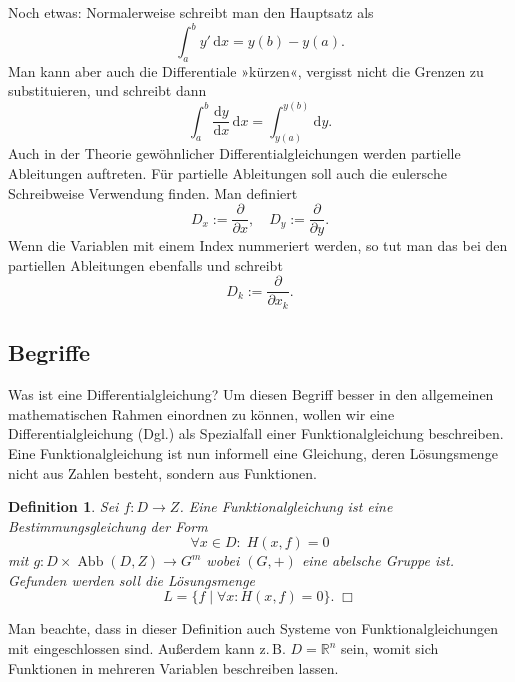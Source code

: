 \documentclass[a4paper,11pt,fleqn,twocolumn,twoside,openany]{scrartcl}
\numberwithin{equation}{section}
\newcommand{\R}{\mathbb R}
\theoremstyle{defstyle}
\newtheorem{Definition}{Definition}
\numberwithin{Definition}{section}
\begin{document}
Noch etwas: Normalerweise schreibt man den Hauptsatz als%
\begin{equation}
\int_a^b y'\,\mathrm dx = y(b)-y(a).
\end{equation}
Man kann aber auch die Differentiale »kürzen«,
vergisst nicht die Grenzen zu substituieren, und schreibt dann%
\begin{equation}
\int_a^b \frac{\mathrm dy}{\mathrm dx}\,\mathrm dx
= \int_{y(a)}^{y(b)}\mathrm dy.
\end{equation}
Auch in der Theorie gewöhnlicher Differentialgleichungen werden
partielle Ableitungen auftreten. Für partielle Ableitungen soll
auch die eulersche Schreibweise Verwendung finden. Man definiert%
\begin{equation}
D_x := \frac{\partial}{\partial x},\quad
D_y := \frac{\partial}{\partial y}.
\end{equation}
Wenn die Variablen mit einem Index nummeriert werden, so
tut man das bei den partiellen Ableitungen ebenfalls und schreibt%
\begin{equation}
D_k := \frac{\partial}{\partial x_k}.
\end{equation}

\subsection{Begriffe}
Was ist eine Differentialgleichung? Um diesen Begriff besser in den
allgemeinen mathematischen Rahmen einordnen zu können, wollen wir eine
Differentialgleichung (Dgl.) als Spezialfall einer Funktionalgleichung
beschreiben. Eine Funktionalgleichung ist nun informell eine Gleichung,
deren Lösungsmenge nicht aus Zahlen besteht, sondern aus Funktionen.

\begin{Definition}
Sei $f\colon D\to Z$. Eine \emph{Funktionalgleichung} ist
eine Bestimmungsgleichung der Form%
\begin{equation}\label{eq:Funktionalgleichung}
\forall x{\in}D\colon\;H(x,f)=0
\end{equation}
mit $g\colon D\times\operatorname{Abb}(D,Z)\to G^m$ wobei $(G,+)$
eine abelsche Gruppe ist. Gefunden werden soll die
Lösungsmenge%
\begin{equation}
L = \{f\mid\forall x\colon H(x,f)=0\}.\;\Box
\end{equation}
\end{Definition}
\noindent
Man beachte, dass in dieser Definition auch Systeme
von Funktionalgleichungen
mit eingeschlossen sind. Außerdem kann z.\,B. $D=\R^n$ sein, womit
sich Funktionen in mehreren Variablen beschreiben lassen.
\end{document}
